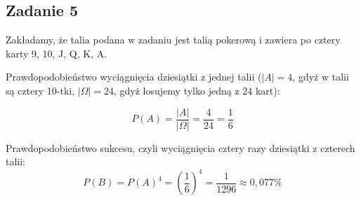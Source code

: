 \subsection{Zadanie 5}

Zakładamy, że talia podana w zadaniu jest talią pokerową i zawiera
po cztery karty 9, 10, J, Q, K, A.

Prawdopodobieństwo wyciągnięcia dziesiątki z jednej talii ($|A|=4$,
gdyż w talii są cztery 10-tki, $|\Omega|=24$, gdyż losujemy tylko jedną z 24 kart):

$$
P(A)=\frac{|A|}{|\Omega|}=\frac{4}{24}=\frac{1}{6}
$$

Prawdopodobieństwo sukcesu, czyli wyciągnięcia cztery razy dziesiątki
z czterech talii:
$$
P(B)=P(A)^4=(\frac{1}{6})^4=\frac{1}{1296}\approx0,077\%
$$

